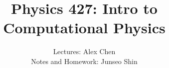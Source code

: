 \documentclass{article}
\author{Lectures: Alex Chen \\ Notes and Homework: Junseo Shin}
\date{}
\title{Physics 427: Intro to Computational Physics}
\begin{document}
\maketitle
\tableofcontents
\pagebreak



\end{document}
